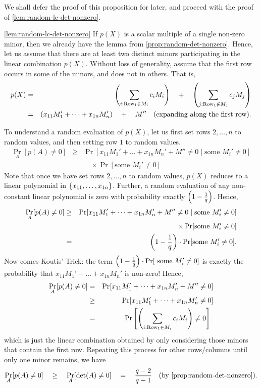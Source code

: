 We shall defer the proof of this proposition for later, and proceed with the proof of \autoref{lem:random-lc-det-nonzero}. 

\begin{proofof}{\autoref{lem:random-lc-det-nonzero}}
  If $p(X)$ is a scalar multiple of a single non-zero minor, then we
  already have the lemma from
  \autoref{prop:random-det-nonzero}. Hence, let us assume that
  there are at least two distinct minors participating in the linear
  combination $p(X)$. Without loss of generality, assume that the
  first row occurs in some of the minors, and does not in others. That is, 
  \begin{eqnarray*}
    p(X) &=& \left(\sum_{i:\text{Row}_1\in M_i} c_i M_i\right) \quad+ \quad \left(\sum_{j:\text{Row}_1\notin M_j} c_j M_j\right)\\
     & = & \left(x_{11} M_1' + \dots + x_{1n} M_{n}'\right) \quad+\quad M'' \quad\text{(expanding along the first row)}.
  \end{eqnarray*}
  
  To understand a random evaluation of $p(X)$, let us first set rows $2, \dots, n$ to random values, and
  then setting row $1$ to random values. 
  \begin{eqnarray*}
    \Pr_{A}[p(A)\neq 0] & \geq & \Pr[x_{11} M_1' + \dots + x_{1n} M_n' + M'' \neq 0 \;|\; \text{some }M_{i}'\neq 0]\\
    & & \quad \times \Pr[\text{some }M_i' \neq 0]
  \end{eqnarray*}
  Note that once we have set rows $2,\dots, n$ to random values, $p(X)$ reduces to a linear polynomial in $\left\{x_{11},\dots, x_{1n}\right\}$. Further, a random evaluation of any non-constant linear polynomial is zero with probability exactly $\left(1 -\frac{1}{q}\right)$. Hence, 
  \begin{eqnarray*}
\Pr_{A}[p(A)\neq 0] & \geq & \Pr[x_{11} M_1' + \dots + x_{1n} M_n' + M'' \neq 0 \;|\; \text{some }M_{i}'\neq 0]\\
 & & \quad \times \Pr[\text{some }M_i' \neq 0]\\
    & = & \left(1 - \frac{1}{q}\right)\cdot \Pr[\text{some }M_i' \neq 0].
  \end{eqnarray*}
  Now comes  Koutis' Trick: the term $\left(1 -
    \frac{1}{q}\right) \cdot \Pr[\text{ some }M_i' \neq 0]$ is exactly the
  probability that $x_{11}M_1' + \dots + x_{1n}M_n'$ is non-zero! Hence,
\begin{eqnarray*}
\Pr_{A}[p(A) \neq 0] & = & \Pr[ x_{11}M_1' + \dots + x_{1n} M_n' + M''\neq 0]\\
 & \geq & \Pr[ x_{11}M_1' + \dots + x_{1n} M_n'\neq 0]\\
 & = & \Pr\left[\left(\sum_{i:\text{Row}_1\in M_i} c_i M_i\right) \neq 0\right].
\end{eqnarray*}
which is just the linear combination obtained by only considering
those minors that contain the first row. Repeating this process for other
rows/columns until only  one minor remains, we have
$$
\Pr_{A}[p(A) \neq 0] \quad \geq \quad \Pr_{A}[\det(A) \neq 0] \quad = \quad
\frac{q-2}{q-1}\quad(\text{by \autoref{prop:random-det-nonzero}}).
$$
\end{proofof}


